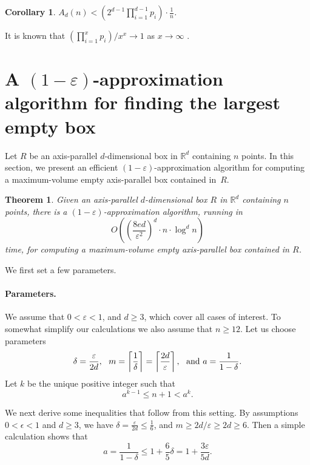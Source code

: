 \documentclass[11pt]{article}
\newtheorem{theorem}{Theorem}
\newtheorem{corollary}{Corollary}
\newcommand{\eps}{\varepsilon}
\newcommand{\RR}{\mathbb{R}}
\begin{document}
\begin{corollary} \label{C2}
$A_d(n) < (2^{d-1} \prod_{i=1}^{d-1} p_i) \cdot \frac{1}{n}$.
\end{corollary} 

It is known  that $ (\prod_{i=1}^{x} p_i) / x^x \to 1$ as $x \to
\infty$ \cite{R97}. 


\section{A $(1-\eps)$-approximation algorithm for finding the largest
empty box}\label{sec:approx1} 

Let $R$ be an axis-parallel $d$-dimensional box in $\RR^d$ 
containing $n$ points. In this section, we present an efficient
$(1-\eps)$-approximation algorithm for computing a maximum-volume
empty axis-parallel box contained in~$R$. 

\begin{theorem} \label{T4}
Given an axis-parallel $d$-dimensional box $R$ in $\RR^d$ containing
$n$ points, there is a $(1-\eps)$-approximation algorithm, running in  
$$ O\left(\left( \frac{8 e d}{\eps^2} \right)^d \cdot n \cdot
\log^d{n} \right) $$
time, for computing a maximum-volume empty axis-parallel box
contained in $R$. 
\end{theorem}


We first set a few parameters. 


\paragraph {Parameters.}

We assume that $0 <\eps <1$, and $d \geq 3$, 
which cover all cases of interest. To somewhat simplify our
calculations we also assume that $n \geq 12$. Let us choose parameters
\begin{equation} \label{E14}
\delta=\frac{\eps}{2d}, \ \ 
m= \left \lceil \frac{1}{\delta} \right \rceil
=\left \lceil \frac{2d}{\eps} \right \rceil, \ \ {\rm and } \ 
a=\frac{1}{1-\delta}.
\end{equation} 
Let $k$ be the unique positive integer such that
\begin{equation} \label{E28}
a^{k-1} \leq n+1 <a^k.
\end{equation} 


We next derive some inequalities that follow from this setting.
By assumptions $0 < \epsilon < 1$ and $d \ge 3$,
we have $\delta =\frac{\eps}{2d} \leq \frac{1}{6}$,
and $m \geq 2d/\eps \geq 2d \geq 6$.  Then a simple calculation shows
that 
\begin{equation} \label{E12}
a = \frac{1}{1-\delta} \le 1+ \frac{6}{5} \delta = 1+ \frac{3\eps}{5d}. 
\end{equation} 
\end{document}
